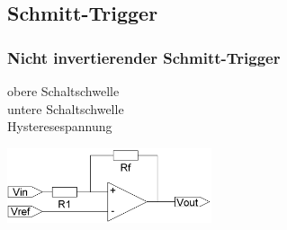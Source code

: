 	\subsection{Schmitt-Trigger}
        \subsubsection{Nicht invertierender Schmitt-Trigger}
			\begin{minipage}[T]{13cm}
                obere Schaltschwelle
                \hspace{10.8mm}\\
                untere Schaltschwelle
                \hspace{9.6mm}\\
                Hysteresespannung
                \hspace{12.8mm}\\
            \end{minipage} 
            \begin{minipage}{6cm}
                \includegraphics[width=6cm]{./bilder/n-schmitt.png} 
            \end{minipage}\\
            

